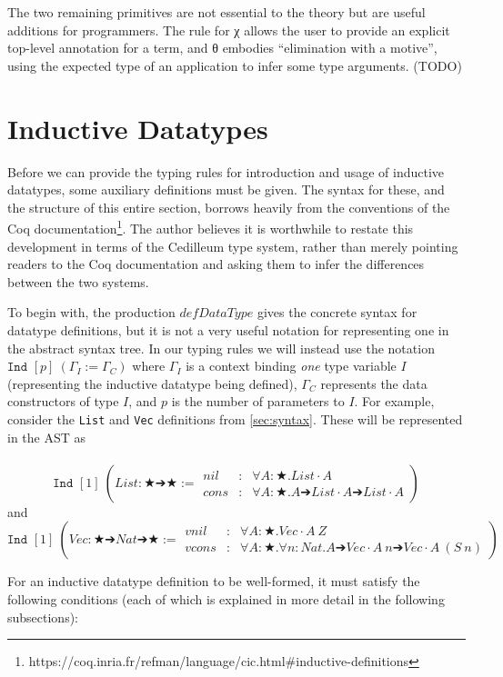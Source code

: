 \documentclass{article}
\newcommand{\indast}[3]{\texttt{Ind } [#1]\ (#2 := #3)}
\begin{document}
The two remaining primitives are not essential to the theory but are useful
additions for programmers. The rule for χ allows the user to provide an
explicit top-level annotation for a term, and θ embodies ``elimination with a
motive'', using the expected type of an application to infer some type
arguments. (TODO)

\section{Inductive Datatypes}

Before we can provide the typing rules for introduction and usage of inductive
datatypes, some auxiliary definitions must be given. The syntax for these, and
the structure of this entire section, borrows heavily from the conventions of the Coq
documentation\footnote{https://coq.inria.fr/refman/language/cic.html\#inductive-definitions}.
The author believes it is worthwhile to restate this development in terms of the
Cedilleum type system, rather than merely pointing readers to the Coq
documentation and asking them to infer the differences between the two systems.

To begin with, the production $defDataType$ gives the concrete syntax for datatype definitions,
but it is not a very useful notation for representing one in the abstract syntax
tree. In our typing rules we will instead use the notation
$\indast{p}{\Gamma_I}{\Gamma_C}$ where $\Gamma_I$ is a context binding
\textit{one} type variable $I$ (representing the inductive datatype being defined),
$\Gamma_C$ represents the data constructors of type $I$, and $p$ is the number
of parameters to $I$. For example, consider the \texttt{List} and \texttt{Vec} definitions from
\ref{sec:syntax}. These will be represented in the AST as
\\ \\
\[\indast{1}{List : ★ ➔ ★}
{\begin{array}{lcl}
   nil & : & ∀ A : ★ . List \cdot A
   \\ cons & : & ∀ A : ★ . A ➔ List \cdot A ➔ List \cdot A
 \end{array}
}\] and
\\
\[\indast{1}{Vec : ★ ➔ Nat ➔ ★}
{\begin{array}{lcl}
   vnil & : & ∀ A : ★ . Vec \cdot A\ Z
   \\ vcons & : & ∀ A : ★ . ∀ n : Nat . A ➔ Vec \cdot A\ n ➔ Vec \cdot A\ (S\ n)
 \end{array}
}\]

For an inductive datatype definition to be well-formed, it must satisfy the
following conditions (each of which is explained in more detail in the following
subsections):
\end{document}
